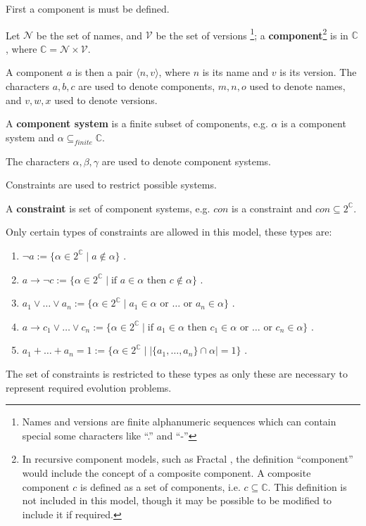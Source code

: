 First a component is must be defined.
\begin{defs}
\label{formal.componentdef}
Let $\mathcal{N}$ be the set of names, and $\mathcal{V}$ be the set of versions \footnote{Names and versions are finite alphanumeric sequences which can contain special some characters like ``.'' and ``-''}; 
a \textbf{component}\footnote{In recursive component models, such as Fractal \citep{Quma2006}, the definition ``component'' would include the concept of a composite component.
A composite component $c$ is defined as a set of components, i.e. $c \subseteq \mathbb{C}$.
This definition is not included in this model, though it may be possible to be modified to include it if required.} 
is in $\mathbb{C}$, where $\mathbb{C} = \mathcal{N} \times \mathcal{V}$. 
\end{defs}
A component $a$ is then a pair $\langle n,v \rangle$, where $n$ is its name and $v$ is its version.
The characters  $a,b,c$ are used to denote components, $m,n,o$ used to denote names, and $v,w,x$ used to denote versions.

\begin{defs}
\label{formal.componentsystemdef}
A \textbf{component system} is a finite subset of components, e.g. $\alpha$ is a component system and $\alpha \subseteq_{finite} \mathbb{C}$. 
\end{defs}
The characters $\alpha,\beta,\gamma$ are used to denote component systems.

Constraints are used to restrict possible systems.
\begin{defs}
\label{formal.constraintdefs}
A \textbf{constraint} is set of component systems, e.g. $con$ is a constraint and $con \subseteq 2^{\mathbb{C}}$.
\end{defs}

Only certain types of constraints are allowed in this model, these types are:
\begin{enumerate}
  \item $\neg a := \{\alpha \in 2^{\mathbb{C}} \mid a \not \in \alpha \}$ \label{formal.removeconstraint}.
  \item $a \rightarrow \neg c := \{\alpha \in 2^{\mathbb{C}} \mid \mbox{if } a \in \alpha \mbox{ then } c \not \in \alpha\}$ \label{formal.conflictconstraint}.
  \item $a_1 \vee \ldots \vee a_n := \{\alpha \in 2^{\mathbb{C}} \mid a_1 \in \alpha \mbox{ or }\ldots \mbox{ or } a_n \in \alpha\}$ \label{formal.keepconstraint}.
  \item $a \rightarrow c_1 \vee \ldots \vee c_n := \{\alpha \in 2^{\mathbb{C}} \mid \mbox{if } a_1 \in \alpha \mbox{ then }  c_1 \in \alpha \mbox{ or } \ldots \mbox{ or } c_n \in \alpha\}$ \label{formal.dependencyconstraint}.
  \item $a_1 + \ldots + a_n = 1 := \{\alpha \in 2^{\mathbb{C}} \mid |\{a_1,\ldots,a_n\} \cap \alpha| = 1\}$ \label{formal.upgradeconstraint}.
\end{enumerate}
The set of constraints is restricted to these types as only these are necessary to represent required evolution problems. 

